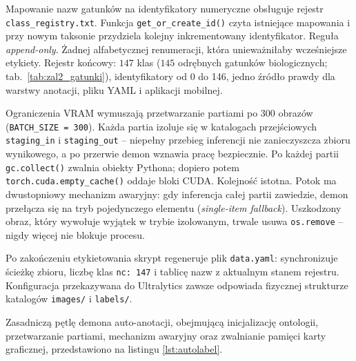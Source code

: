 Mapowanie nazw gatunków na identyfikatory numeryczne obsługuje rejestr \texttt{class\_registry.txt}. Funkcja \texttt{get\_or\_create\_id()} czyta istniejące mapowania i przy nowym taksonie przydziela kolejny inkrementowany identyfikator. Reguła \textit{append-only}. Żadnej alfabetycznej renumeracji, która unieważniłaby wcześniejsze etykiety. Rejestr końcowy: $147$ klas ($145$ odrębnych gatunków biologicznych; tab.~\ref{tab:zal2_gatunki}), identyfikatory od 0 do 146, jedno źródło prawdy dla warstwy anotacji, pliku YAML i aplikacji mobilnej.

Ograniczenia VRAM wymuszają przetwarzanie partiami po 300 obrazów (\texttt{BATCH\_SIZE = 300}). Każda partia izoluje się w katalogach przejściowych \texttt{staging\_in} i \texttt{staging\_out} – niepełny przebieg inferencji nie zanieczyszcza zbioru wynikowego, a po przerwie demon wznawia pracę bezpiecznie. Po każdej partii \texttt{gc.collect()} zwalnia obiekty Pythona; dopiero potem \texttt{torch.cuda.empty\_cache()} oddaje bloki CUDA. Kolejność istotna. Potok ma dwustopniowy mechanizm awaryjny: gdy inferencja całej partii zawiedzie, demon przełącza się na tryb pojedynczego elementu (\textit{single-item fallback}). Uszkodzony obraz, który wywołuje wyjątek w trybie izolowanym, trwale usuwa \texttt{os.remove} – nigdy więcej nie blokuje procesu.

Po zakończeniu etykietowania skrypt regeneruje plik \texttt{data.yaml}: synchronizuje ścieżkę zbioru, liczbę klas \texttt{nc: 147} i tablicę nazw z aktualnym stanem rejestru. Konfiguracja przekazywana do Ultralytics zawsze odpowiada fizycznej strukturze katalogów \texttt{images/} i \texttt{labels/}.

Zasadniczą pętlę demona auto-anotacji, obejmującą inicjalizację ontologii, przetwarzanie partiami, mechanizm awaryjny oraz zwalnianie pamięci karty graficznej, przedstawiono na listingu \ref{lst:autolabel}.

